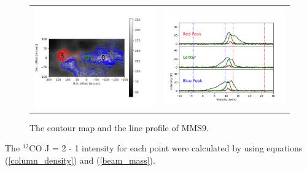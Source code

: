 \begin{figure}[h!]
	\begin{center}
		\begin{tabular}{cc}
			\includegraphics[width=7cm]{Orion_12CO2-1_MMS9_rbcontour_400_modified} &   \includegraphics[width=7cm]{Orion_12CO2-1_MMS9_line_profile_400}
		\end{tabular}	
		\caption{The contour map and the line profile of MMS9. }
	\label{fig:MMS921}
	\end{center}
\end{figure}

\clearpage
\newpage
\noindent The $^{12}$CO J = 2 - 1 intensity for each point were calculated by using equations (\ref{column_density}) and (\ref{beam_mass}). \\

